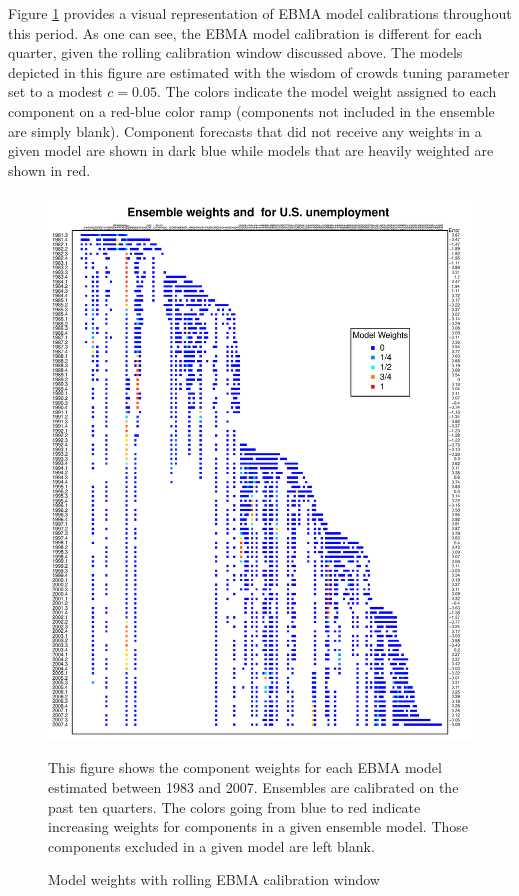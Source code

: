 \documentclass[12pt,fullpage,endnotes]{article}
\begin{document}
Figure \ref{modelWeights} provides a visual representation of EBMA
model calibrations throughout this period. As one can see, the EBMA model calibration is different for each quarter, given the rolling calibration window discussed above. The models depicted in this figure are estimated with the wisdom of crowds tuning parameter set to a modest $c=0.05$.  The colors
indicate the model weight assigned to each component on a red-blue
color ramp (components not included in the ensemble are simply blank).  Component forecasts that did not receive any weights in a given model are shown in dark blue while models that are
heavily weighted are shown in red.

\begin{figure}[h]
\caption{Model weights with rolling EBMA calibration window}
\label{modelWeights}
\begin{center}
\includegraphics[scale=.95]{awesome}
\end{center}

\footnotesize This figure shows the component weights for each EBMA model estimated between 1983 and 2007. Ensembles are calibrated on the past ten quarters. The colors going from blue to red indicate increasing weights for components in a given ensemble model. Those components excluded in a given model are left blank.

\end{figure}
\end{document}
